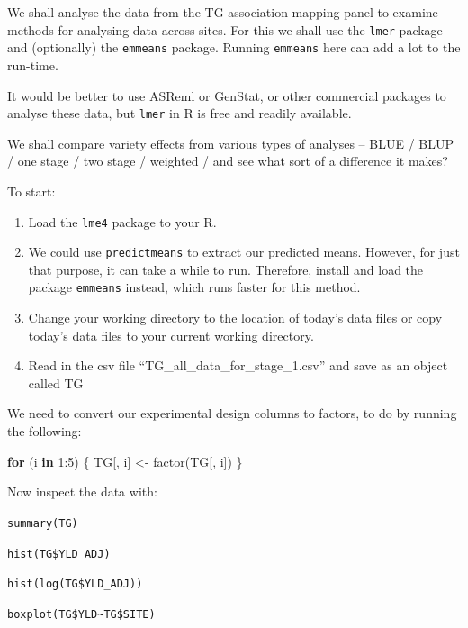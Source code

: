 \documentclass[
]{book}
\newenvironment{Shaded}{\begin{snugshade}}{\end{snugshade}}
\newcommand{\ControlFlowTok}[1]{\textcolor[rgb]{0.13,0.29,0.53}{\textbf{#1}}}
\newcommand{\DecValTok}[1]{\textcolor[rgb]{0.00,0.00,0.81}{#1}}
\newcommand{\FunctionTok}[1]{\textcolor[rgb]{0.00,0.00,0.00}{#1}}
\newcommand{\NormalTok}[1]{#1}
\newcommand{\OtherTok}[1]{\textcolor[rgb]{0.56,0.35,0.01}{#1}}
\newcommand{\SpecialCharTok}[1]{\textcolor[rgb]{0.00,0.00,0.00}{#1}}
\begin{document}
We shall analyse the data from the TG association mapping panel to examine methods for analysing data across sites. For this we shall use the \texttt{lmer} package and (optionally) the \texttt{emmeans} package. Running \texttt{emmeans} here can add a lot to the run-time.

It would be better to use ASReml or GenStat, or other commercial packages to analyse these data, but \texttt{lmer} in R is free and readily available.

We shall compare variety effects from various types of analyses -- BLUE / BLUP / one stage / two stage / weighted / and see what sort of a difference it makes?

To start:

\begin{enumerate}
\def\labelenumi{\arabic{enumi}.}
\item
  Load the \texttt{lme4} package to your R.
\item
  We could use \texttt{predictmeans} to extract our predicted means. However, for just that purpose, it can take a while to run. Therefore, install and load the package \texttt{emmeans} \citep{R-emmeans} instead, which runs faster for this method.
\item
  Change your working directory to the location of today's data files or copy today's data files to your current working directory.
\item
  Read in the csv file ``TG\_all\_data\_for\_stage\_1.csv'' and save as an object called TG
\end{enumerate}

We need to convert our experimental design columns to factors, to do by running the following:

\begin{Shaded}
\begin{Highlighting}[]
\ControlFlowTok{for}\NormalTok{ (i }\ControlFlowTok{in} \DecValTok{1}\SpecialCharTok{:}\DecValTok{5}\NormalTok{) \{}
\NormalTok{    TG[, i] }\OtherTok{\textless{}{-}} \FunctionTok{factor}\NormalTok{(TG[, i])}
\NormalTok{\}}
\end{Highlighting}
\end{Shaded}

Now inspect the data with:

\texttt{summary(TG)}

\texttt{hist(TG\$YLD\_ADJ)}

\texttt{hist(log(TG\$YLD\_ADJ))}

\texttt{boxplot(TG\$YLD\textasciitilde{}TG\$SITE)}
\end{document}
